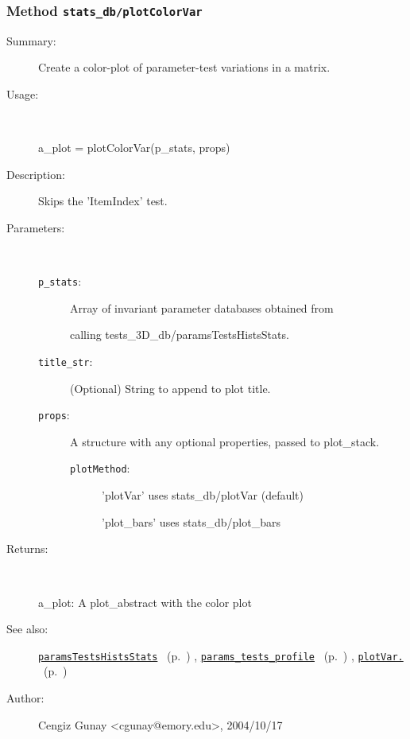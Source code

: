 \subsubsection[Method \texttt{plotColorVar}]{Method \texttt{stats\_db/plotColorVar}}%
%
\label{ref_stats_db__plotColorVar}%
\hypertarget{ref_stats_db__plotColorVar}{}%
\begin{description}
\item[Summary:]Create a color-plot of parameter-test variations in a matrix.
%
\item[Usage:]~%
\begin{lyxcode}%
a\_plot = plotColorVar(p\_stats, props)
%
\end{lyxcode}%
%
\item[Description:]%
Skips the 'ItemIndex' test.
\item[Parameters:]~
\begin{description}%
\item[\texttt{p\_stats}:]
 Array of invariant parameter databases obtained from

calling tests\_3D\_db/paramsTestsHistsStats.\item[\texttt{title\_str}:]
 (Optional) String to append to plot title.
\item[\texttt{props}:]
 A structure with any optional properties, passed to plot\_stack.
\begin{description}%
\item[\texttt{plotMethod}:]
 'plotVar' uses stats\_db/plotVar (default)

'plot\_bars' uses stats\_db/plot\_bars\end{description}%
\end{description}%
%
\item[Returns:]~

	a\_plot: A plot\_abstract with the color plot
%
%
\item[See also:]%
\hyperlink{ref_paramsTestsHistsStats}{\texttt{paramsTestsHistsStats}}%
\ (p.~\pageref{ref_paramsTestsHistsStats})%
%
, \hyperlink{ref_params_tests_profile}{\texttt{params\_tests\_profile}}%
\ (p.~\pageref{ref_params_tests_profile})%
%
, \hyperlink{ref_plotVar.}{\texttt{plotVar.}}%
\ (p.~\pageref{ref_plotVar.})%
%
%
\item[Author:]%
Cengiz Gunay <cgunay@emory.edu>, 2004/10/17%
\end{description}
\methodline%
